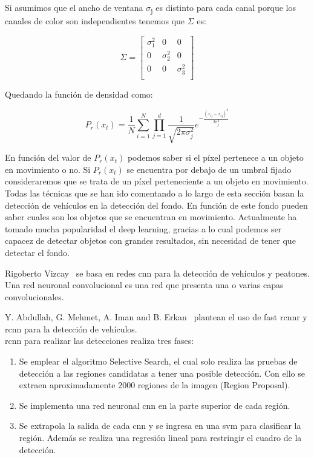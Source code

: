 Si asumimos que el ancho de ventana $\sigma$\textsubscript{j} es distinto para cada canal porque los canales de color son independientes tenemos que $\Sigma$ es:

\begin{equation}\label{matriz_sigma}
   \Sigma = \begin{bmatrix}
            \sigma_{1}^2 & 0 & 0 \\
            0 & \sigma_{2}^2 & 0 \\
            0 & 0 & \sigma_{3}^2 \\
\end{bmatrix}
\end{equation}

Quedando la función de densidad como:

\begin{equation}\label{funcion_densidad}
{P}_{r}(x_{t}) = \frac{1}{N}\sum_{i=1}^{N}\prod_{j=1}^{d}\frac{1}{\sqrt{2\pi\sigma_{j}^2}} e^{-\frac{(x_{tj}-x_{ij})^2}{2\sigma_{j}^2}}
\end{equation}

En función del valor de $P_{
r}(x_{t})$ podemos saber si el píxel pertenece a un objeto en movimiento o no. Si  $P_{
r}(x_{t})$ se encuentra por debajo de un umbral fijado consideraremos que se trata de un píxel perteneciente a un objeto en movimiento.
\\

Todas las técnicas que se han ido comentando a lo largo de esta sección basan la detección de vehículos en la detección del fondo. En función de este fondo pueden saber cuales son los objetos que se encuentran en movimiento. Actualmente ha tomado mucha popularidad el deep learning, gracias a lo cual podemos ser capacez de detectar objetos con grandes resultados, sin necesidad de tener que detectar el fondo. 

Rigoberto Vizcay~\cite{tesis_rigoberto} se basa en redes \acrshort{cnn} para la detección de vehículos y peatones. Una red neuronal convolucional es una red que presenta una o varias capas convolucionales.

Y. Abdullah, G. Mehmet, A. Iman and B. Erkan~\cite{rcnn_detection}  plantean el uso de fast \acrfull{rcnn}r y \acrfull{rcnn} para la detección de vehículos. 
\\

\acrshort{rcnn} para realizar las detecciones realiza tres fases:
\begin{enumerate}
    \item Se emplear el algoritmo Selective Search, el cual solo realiza las pruebas de detección a las regiones candidatas a tener una posible detección. Con ello se extraen aproximadamente 2000 regiones de la imagen (Region Proposal).
    \item Se implementa una red neuronal \acrfull{cnn} en la parte superior de cada región.
    \item Se extrapola la salida de cada \acrshort{cnn} y se ingresa en una \acrfull{svm} para clasificar la región. Además se realiza una regresión lineal para restringir el cuadro de la detección.
\end{enumerate}


